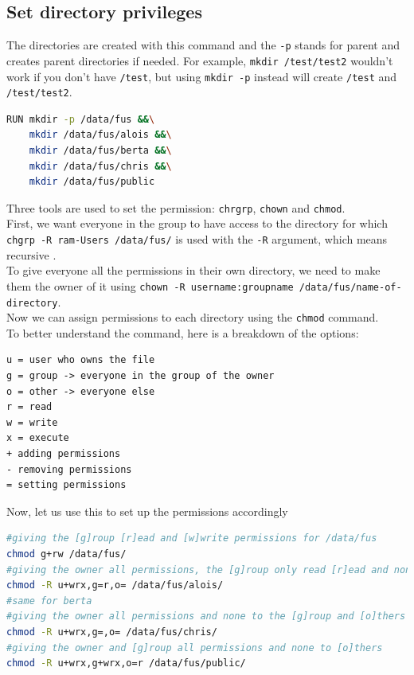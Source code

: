 \documentclass[a4paper]{article}
\begin{document}
\subsection {Set directory privileges}
The directories are created with this command and the \texttt{-p} stands for parent and creates parent directories if needed. For example, \texttt{mkdir /test/test2} wouldn't work if you don't have \texttt{/test}, but using \texttt{mkdir -p} instead will create \texttt{/test} and \texttt{/test/test2}.
\begin{lstlisting}[language=bash]
RUN mkdir -p /data/fus &&\
    mkdir /data/fus/alois &&\
    mkdir /data/fus/berta &&\
    mkdir /data/fus/chris &&\
    mkdir /data/fus/public
\end{lstlisting}
Three tools are used to set the permission: \texttt{chrgrp}, \texttt{chown} and \texttt{chmod}. \\
First, we want everyone in the group to have access to the directory for which \texttt{chgrp -R ram-Users /data/fus/} is used with the \texttt{-R} argument, which means recursive \cite{perms,chgrp}.
\\To give everyone all the permissions in their own directory, we need to make them the owner of it using \texttt{chown -R username:groupname /data/fus/name-of-directory}.\cite{chown} \\
Now we can assign permissions to each directory using the \texttt{chmod}\cite{chmod} command. \\
To better understand the command, here is a breakdown of the options: \\ 
\begin{lstlisting}
u = user who owns the file
g = group -> everyone in the group of the owner
o = other -> everyone else
r = read
w = write
x = execute
+ adding permissions
- removing permissions
= setting permissions
\end{lstlisting} \cite{chmod}
Now, let us use this to set up the permissions accordingly
\begin{lstlisting}[language=bash]
#giving the [g]roup [r]ead and [w]write permissions for /data/fus
chmod g+rw /data/fus/
#giving the owner all permissions, the [g]roup only read [r]ead and none to [o]thers
chmod -R u+wrx,g=r,o= /data/fus/alois/
#same for berta
#giving the owner all permissions and none to the [g]roup and [o]thers
chmod -R u+wrx,g=,o= /data/fus/chris/ 
#giving the owner and [g]roup all permissions and none to [o]thers
chmod -R u+wrx,g+wrx,o=r /data/fus/public/
\end{lstlisting} \cite{chmod}
\end{document}
